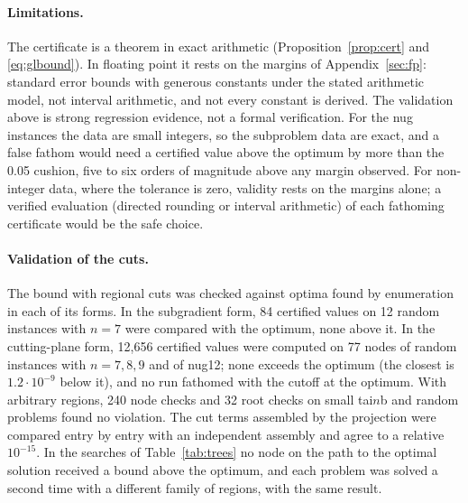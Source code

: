 \documentclass[11pt]{article}
\theoremstyle{remark}
\begin{document}
\paragraph{Limitations.} The certificate is a theorem in exact arithmetic
(Proposition~\ref{prop:cert} and \eqref{eq:glbound}). In floating point it rests
on the margins of Appendix~\ref{sec:fp}: standard error bounds with generous
constants under the stated arithmetic model, not interval arithmetic, and not
every constant is derived. The validation above is strong regression evidence, not
a formal verification. For the nug instances the data are small integers, so the
subproblem data are exact, and a false fathom would need a certified value above
the optimum by more than the 0.05 cushion, five to six orders of magnitude above
any margin observed. For non-integer data, where the tolerance is zero, validity
rests on the margins alone; a verified evaluation (directed rounding or interval
arithmetic) of each fathoming certificate would be the safe choice.

\paragraph{Validation of the cuts.} The bound with regional cuts was checked
against optima found by enumeration in each of its forms. In the subgradient
form, 84 certified values on 12 random instances with $n = 7$ were compared
with the optimum, none above it. In the cutting-plane form, 12,656 certified
values were computed on 77 nodes of random instances with $n = 7, 8, 9$ and of
nug12; none exceeds the optimum (the closest is $1.2\cdot10^{-9}$ below it), and
no run fathomed with the cutoff at the optimum. With arbitrary regions, 240
node checks and 32 root checks on small tai$n$b and random problems found no
violation. The cut terms assembled by the projection were compared entry by
entry with an independent assembly and agree to a relative $10^{-15}$. In the
searches of Table~\ref{tab:trees} no node on the path to the optimal solution
received a bound above the optimum, and each problem was solved a second time
with a different family of regions, with the same result.
\end{document}

